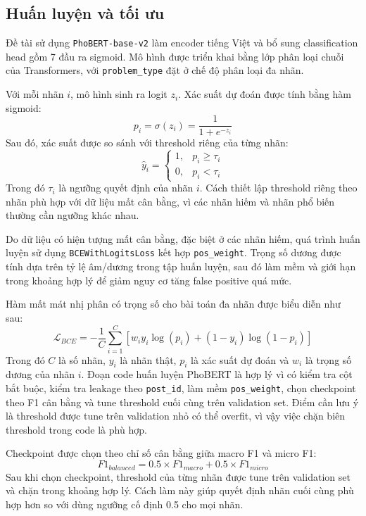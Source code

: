\subsection{Huấn luyện và tối ưu}
Đề tài sử dụng \texttt{PhoBERT-base-v2} làm encoder tiếng Việt và bổ sung classification head gồm 7 đầu ra sigmoid. Mô hình được triển khai bằng lớp phân loại chuỗi của Transformers, với \texttt{problem\_type} đặt ở chế độ phân loại đa nhãn.

Với mỗi nhãn \(i\), mô hình sinh ra logit \(z_i\). Xác suất dự đoán được tính bằng hàm sigmoid:
\[
p_i = \sigma(z_i) = \frac{1}{1 + e^{-z_i}}
\]
Sau đó, xác suất được so sánh với threshold riêng của từng nhãn:
\[
\hat{y}_i =
\begin{cases}
1, & p_i \geq \tau_i \\
0, & p_i < \tau_i
\end{cases}
\]
Trong đó \(\tau_i\) là ngưỡng quyết định của nhãn \(i\). Cách thiết lập threshold riêng theo nhãn phù hợp với dữ liệu mất cân bằng, vì các nhãn hiếm và nhãn phổ biến thường cần ngưỡng khác nhau.

Do dữ liệu có hiện tượng mất cân bằng, đặc biệt ở các nhãn hiếm, quá trình huấn luyện sử dụng \texttt{BCEWithLogitsLoss} kết hợp \texttt{pos\_weight}. Trọng số dương được tính dựa trên tỷ lệ âm/dương trong tập huấn luyện, sau đó làm mềm và giới hạn trong khoảng hợp lý để giảm nguy cơ tăng false positive quá mức.

Hàm mất mát nhị phân có trọng số cho bài toán đa nhãn được biểu diễn như sau:
\[
\mathcal{L}_{BCE}
= -\frac{1}{C}\sum_{i=1}^{C}
\left[
w_i y_i \log(p_i) + (1-y_i)\log(1-p_i)
\right]
\]
Trong đó \(C\) là số nhãn, \(y_i\) là nhãn thật, \(p_i\) là xác suất dự đoán và \(w_i\) là trọng số dương của nhãn \(i\). Đoạn code huấn luyện PhoBERT là hợp lý vì có kiểm tra cột bắt buộc, kiểm tra leakage theo \texttt{post\_id}, làm mềm \texttt{pos\_weight}, chọn checkpoint theo F1 cân bằng và tune threshold cuối cùng trên validation set. Điểm cần lưu ý là threshold được tune trên validation nhỏ có thể overfit, vì vậy việc chặn biên threshold trong code là phù hợp.

Checkpoint được chọn theo chỉ số cân bằng giữa macro F1 và micro F1:
\[
F1_{balanced} = 0.5 \times F1_{macro} + 0.5 \times F1_{micro}
\]
Sau khi chọn checkpoint, threshold của từng nhãn được tune trên validation set và chặn trong khoảng hợp lý. Cách làm này giúp quyết định nhãn cuối cùng phù hợp hơn so với dùng ngưỡng cố định 0.5 cho mọi nhãn.

